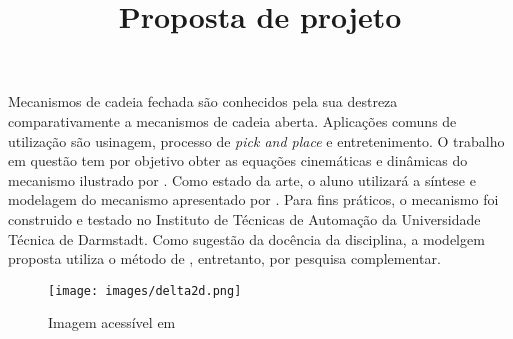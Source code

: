 \documentclass[]{article}
\title{Proposta de projeto}
\author{\studentname \qquad \uspid \qquad \uspmail}
\begin{document}
\maketitle
\thispagestyle{fancy}

Mecanismos de cadeia fechada são conhecidos pela sua destreza comparativamente a mecanismos de cadeia aberta. Aplicações comuns de utilização são usinagem, processo de \emph{pick and place} e entretenimento. O trabalho em questão tem por objetivo obter as equações cinemáticas e dinâmicas do mecanismo ilustrado por \autocite{deskriptor2014}. Como estado da arte, o aluno utilizará a síntese e modelagem do mecanismo apresentado por \citeauthor{tubiblio52241}. Para fins práticos, o mecanismo foi construido e testado no Instituto de Técnicas de Automação da Universidade Técnica de Darmstadt. Como sugestão da docência da disciplina, a modelgem proposta utiliza o método de \citeauthor{udwadia_kalaba_1996}, entretanto, por pesquisa complementar.

\begin{figure}[!h]
    \centering
    \texttt{[image: images/delta2d.png]}
    \caption{Imagem acessível em }
    \label{fig:my_label}
\end{figure}

\newpage

\printbibliography 
\end{document}
